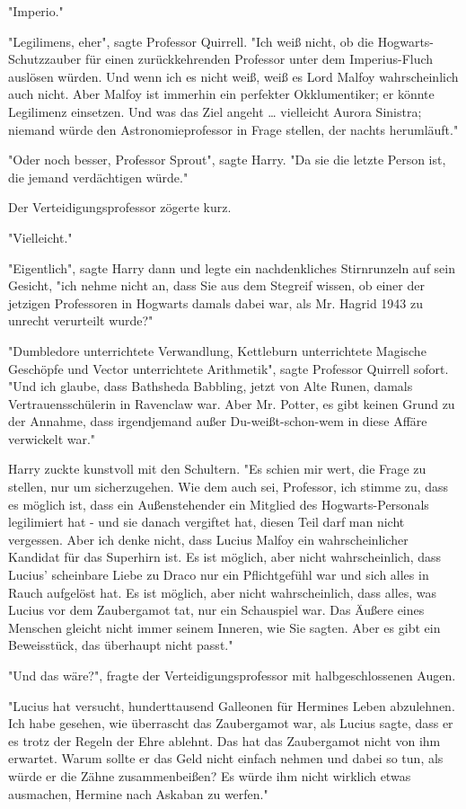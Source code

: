 {"Imperio."

"Legilimens, eher", sagte Professor Quirrell. "Ich weiß nicht, ob die Hogwarts-Schutzzauber für einen zurückkehrenden Professor unter dem Imperius-Fluch auslösen würden. Und wenn ich es nicht weiß, weiß es Lord Malfoy wahrscheinlich auch nicht. Aber Malfoy ist immerhin ein perfekter Okklumentiker; er könnte Legilimenz einsetzen. Und was das Ziel angeht … vielleicht Aurora Sinistra; niemand würde den Astronomieprofessor in Frage stellen, der nachts herumläuft."

"Oder noch besser, Professor Sprout", sagte Harry. "Da sie die letzte Person ist, die jemand verdächtigen würde."

Der Verteidigungsprofessor zögerte kurz.

"Vielleicht."

"Eigentlich", sagte Harry dann und legte ein nachdenkliches Stirnrunzeln auf sein Gesicht, "ich nehme nicht an, dass Sie aus dem Stegreif wissen, ob einer der jetzigen Professoren in Hogwarts damals dabei war, als Mr. Hagrid 1943 zu unrecht verurteilt wurde?"

"Dumbledore unterrichtete Verwandlung, Kettleburn unterrichtete Magische Geschöpfe und Vector unterrichtete Arithmetik", sagte Professor Quirrell sofort. "Und ich glaube, dass Bathsheda Babbling, jetzt von Alte Runen, damals Vertrauensschülerin in Ravenclaw war. Aber Mr. Potter, es gibt keinen Grund zu der Annahme, dass irgendjemand außer Du-weißt-schon-wem in diese Affäre verwickelt war."

Harry zuckte kunstvoll mit den Schultern. "Es schien mir wert, die Frage zu stellen, nur um sicherzugehen. Wie dem auch sei, Professor, ich stimme zu, dass es möglich ist, dass ein Außenstehender ein Mitglied des Hogwarts-Personals legilimiert hat - und sie danach vergiftet hat, diesen Teil darf man nicht vergessen. Aber ich denke nicht, dass Lucius Malfoy ein wahrscheinlicher Kandidat für das Superhirn ist. Es ist möglich, aber nicht wahrscheinlich, dass Lucius' scheinbare Liebe zu Draco nur ein Pflichtgefühl war und sich alles in Rauch aufgelöst hat. Es ist möglich, aber nicht wahrscheinlich, dass alles, was Lucius vor dem Zaubergamot tat, nur ein Schauspiel war. Das Äußere eines Menschen gleicht nicht immer seinem Inneren, wie Sie sagten. Aber es gibt ein Beweisstück, das überhaupt nicht passt."

"Und das wäre?", fragte der Verteidigungsprofessor mit halbgeschlossenen Augen.

"Lucius hat versucht, hunderttausend Galleonen für Hermines Leben abzulehnen. Ich habe gesehen, wie überrascht das Zaubergamot war, als Lucius sagte, dass er es trotz der Regeln der Ehre ablehnt. Das hat das Zaubergamot nicht von ihm erwartet. Warum sollte er das Geld nicht einfach nehmen und dabei so tun, als würde er die Zähne zusammenbeißen? Es würde ihm nicht wirklich etwas ausmachen, Hermine nach Askaban zu werfen."

}
